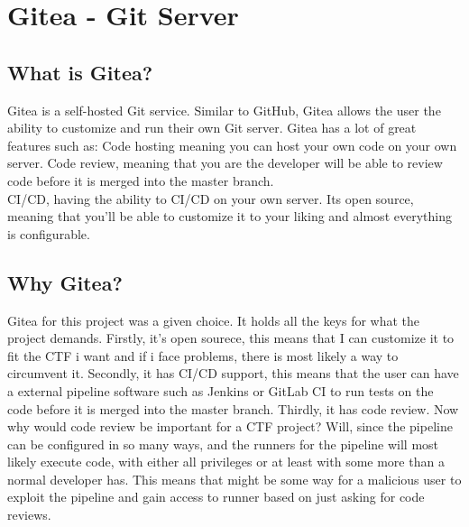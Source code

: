 \section{Gitea - Git Server}

\subsection{What is Gitea?}

Gitea\cite{giteadocs} is a self-hosted \ac{Git}\cite{git} service. Similar to GitHub\cite{GitHub}, Gitea allows the user the ability to customize and run 
their own Git server. Gitea has a lot of great features such as: Code hosting meaning you can host your own code on your own server.
Code review, meaning that you are the developer will be able to review code before it is merged into the master branch.\\
\ac{CI/CD}, having the ability to \ac{CI/CD} on your own server.
Its open source, meaning that you'll be able to customize it to your liking and almost everything is 
configurable.

\subsection{Why Gitea?}
Gitea for this project was a given choice. It holds all the keys for what the project demands.
Firstly, it's open sourece, this means that I can customize it to fit the CTF i want and if i face problems, 
there is most likely a way to circumvent it. Secondly, it has \ac{CI/CD} support, this means that the user 
can have a external pipeline software such as Jenkins\cite{jenkinsio} or GitLab CI\cite{gitlab} to run tests on the code before it is
merged into the master branch. Thirdly, it has code review. Now why would code review be important for a \ac{CTF} project?
Will, since the pipeline can be configured in so many ways, and the runners for the pipeline will most likely execute code, 
with either all privileges or at least with some more than a normal developer has. This means that might be some way 
for a malicious user to exploit the pipeline and gain access to runner based on just asking for code reviews.


